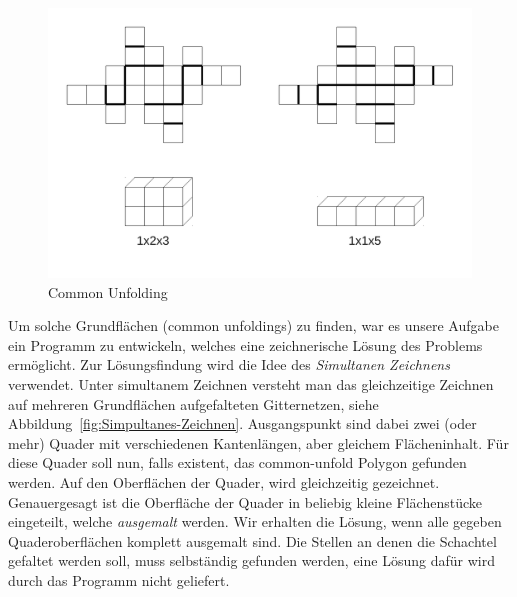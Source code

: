 \begin{figure}[htbp]
\centering
\includegraphics[scale=0.5]{03_pics/commonUnfold_beispiel1.pdf}
\caption{Common Unfolding}
\label{fig:Common-Unfolding}
\end{figure}

Um solche Grundflächen (common unfoldings) zu finden, war es unsere Aufgabe ein Programm zu entwickeln, welches eine zeichnerische Lösung des Problems ermöglicht. Zur Lösungsfindung wird die Idee des \emph{Simultanen Zeichnens} verwendet. Unter simultanem Zeichnen versteht man das gleichzeitige Zeichnen auf mehreren Grundflächen \bzw aufgefalteten Gitternetzen, siehe Abbildung~\ref{fig:Simpultanes-Zeichnen}. Ausgangspunkt sind dabei zwei (oder mehr) Quader mit verschiedenen Kantenlängen, aber gleichem Flächeninhalt. Für diese Quader soll nun, falls existent, das common-unfold Polygon gefunden werden. Auf den Oberflächen der Quader, wird gleichzeitig gezeichnet. Genauergesagt ist die Oberfläche der Quader in beliebig kleine Flächenstücke eingeteilt, welche \emph{ausgemalt} werden. Wir erhalten die Lösung, wenn alle gegeben Quaderoberflächen komplett ausgemalt sind. Die Stellen an denen die Schachtel gefaltet werden soll, muss selbständig gefunden werden, eine Lösung dafür wird durch das Programm nicht geliefert. 


